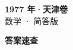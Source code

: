 \documentclass[zihao=-4, a4paper]{ctexart}
\begin{document}
\begin{center}
  {\Large\bfseries 1977 年·天津卷}\\[4pt]
  {\large 数学 · 简答版}
\end{center}
\medskip
{}

\clearpage
{}
\begin{center}{\Large\bfseries 答案速查}\end{center}
\medskip

\end{document}
